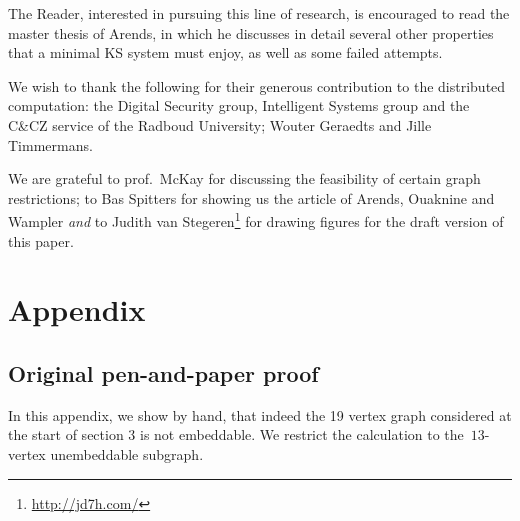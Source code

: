 \documentclass{report}
\begin{document}
The Reader, interested in pursuing this line of research,
is encouraged to read the master thesis\cite{a09} of Arends,
in which he discusses in detail several other
properties that a minimal KS system must enjoy, as well as
some failed attempts.

\begin{acknowledgment}
We wish to thank the following for their generous contribution to the
distributed computation:
    the Digital Security group, Intelligent Systems group
    and the C\&CZ service of the Radboud University;
    Wouter Geraedts and
    Jille Timmermans.

We are grateful to prof.~McKay for discussing the feasibility of
certain graph restrictions; to Bas Spitters for showing us the
article of Arends, Ouaknine and Wampler \emph{and} to Judith van
Stegeren\footnote{\url{http://jd7h.com/}} for drawing figures for
the draft version of this paper.
\end{acknowledgment}

\clearpage
{}


\appendix
\clearpage
\renewcommand{\thesubsection}{\Alph{subsection}}
\renewcommand{\thesection}{\Alph{subsection}}
\section*{Appendix}
\subsection{Original pen-and-paper proof}
In this appendix, we show by hand, that indeed the 19 vertex graph
considered at the start of section 3 %
is not embeddable.
We restrict the calculation to the~$13$-vertex unembeddable
subgraph.
\end{document}
